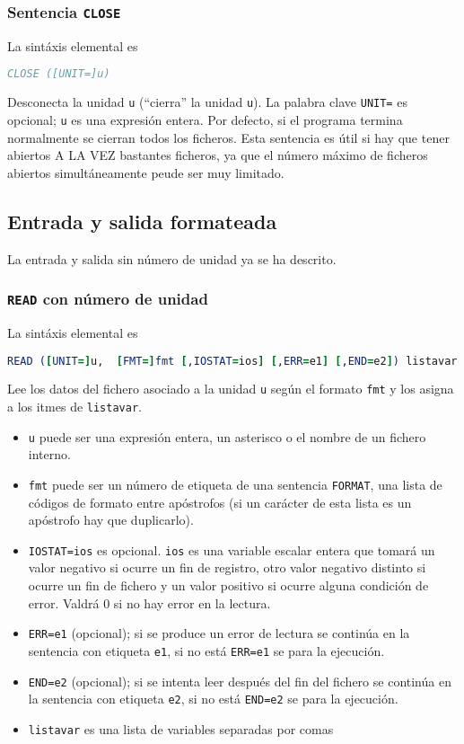 \subsubsection{Sentencia \texttt{CLOSE}}


La sintáxis elemental es 

\begin{lstlisting}[language=Fortran]
	CLOSE ([UNIT=]u)
\end{lstlisting}
Desconecta la unidad {\tt u} (``cierra'' la unidad {\tt u}). La palabra clave {\tt UNIT=} es opcional; {\tt u} es una expresión entera. Por defecto, si el programa termina normalmente se cierran todos los ficheros. Esta sentencia es útil si hay que tener abiertos A LA VEZ bastantes ficheros, ya que el número máximo de ficheros abiertos simultáneamente peude ser muy limitado.


\subsection{Entrada y salida formateada}

La entrada y salida sin número de unidad ya se ha descrito. 

\subsubsection{\texttt{READ} con número de unidad}


La sintáxis elemental es 

\begin{lstlisting}[language=Fortran]
	READ ([UNIT=]u,  [FMT=]fmt [,IOSTAT=ios] [,ERR=e1] [,END=e2]) listavar
\end{lstlisting}
Lee los datos del fichero asociado a la unidad {\tt u} según el formato {\tt fmt} y los asigna a los itmes de {\tt listavar}.

\begin{itemize}
\item {\tt u} puede ser una expresión entera, un asterisco o el nombre de un fichero interno.
\item {\tt fmt} puede ser un número de etiqueta de una sentencia {\tt FORMAT}, una lista de códigos de formato entre apóstrofos (si un carácter de esta lista es un apóstrofo hay que duplicarlo).
\item {\tt IOSTAT=ios} es opcional. {\tt ios} es una variable escalar entera que tomará un valor negativo si ocurre un fin de registro, otro valor negativo distinto si ocurre un fin de fichero y un valor positivo si ocurre alguna condición de error. Valdrá 0 si no hay error en la lectura.
\item {\tt ERR=e1} (opcional); si se produce un error de lectura se continúa en la
sentencia con etiqueta {\tt e1}, si no está {\tt ERR=e1} se para la ejecución.
\item {\tt END=e2} (opcional); si se intenta leer después del fin del fichero se continúa en la sentencia con etiqueta {\tt e2}, si no está {\tt END=e2} se para la ejecución.
\item {\tt listavar} es una lista de variables separadas por comas
\end{itemize}


